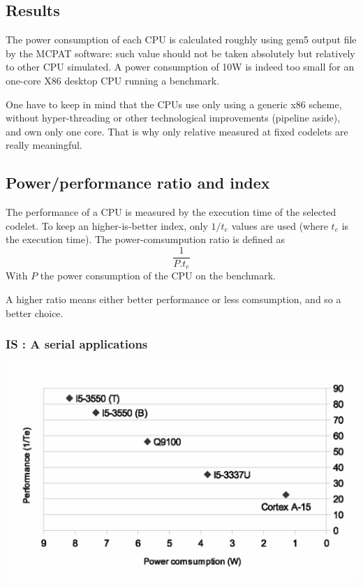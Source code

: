 \documentclass{article}
\newenvironment{Figure}
  {\par\medskip\noindent\center\minipage{0.9\linewidth}}
  {\endminipage\par\bigskip\medskip}
\begin{document}
\begin{multicols}{2}

\section{Results}
\label{results}
The power consumption of each CPU is calculated roughly using gem5 output file by the MCPAT software: such value should not be taken absolutely but relatively to other CPU simulated. A power consumption of 10W is indeed too small for an one-core X86 desktop CPU running a benchmark. 

One have to keep in mind that the CPUs use only using a generic x86 scheme, without hyper-threading or other technological improvements (pipeline aside), and own only one core. That is why only relative measured at fixed codelets are really meaningful.

\subsection{Power/performance ratio and index}
The performance of a CPU is measured by the execution time of the selected codelet. To keep an higher-is-better index, only $1/t_e$ values are used (where $t_e$ is the execution time).
The power-comsumpution ratio is defined as 
\begin{equation}
\frac{1}{P.t_e}
\end{equation}
With $P$ the power consumption of the CPU on the benchmark.

A higher ratio means either better performance or less comsumption, and so a better choice.


\subsubsection{IS : A serial applications}
\begin{Figure}
\centering
\includegraphics[width=\linewidth]{IS.eps}
\end{Figure}


\end{multicols}
\end{document}
